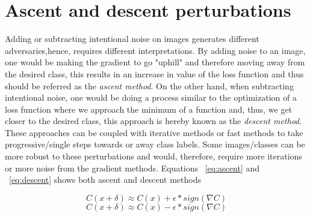 \section{Ascent and descent perturbations}\label{sec:gsm}

Adding or subtracting intentional noise on images generates different adversaries,hence, requires different interpretations. By adding noise to an image, one would be making the gradient to go "uphill" and therefore moving away from the desired class, this results in an increase in value of the loss function and thus should be referred as the \textit{ascent method}. On the other hand, when subtracting intentional noise, one would be doing a process similar to the optimization of a loss function where we approach the minimum of a function and, thus, we get closer to the desired class, this approach is hereby known as the \textit{descent method}. These approaches can be coupled with iterative methods or fast methods to take progressive/single steps towards or away class labels. Some images/classes can be more robust to these perturbations and would, therefore, require more iterations or more noise from the gradient methods. Equations ~\ref{eq:ascent} and ~\ref{eq:descent} shows both ascent and descent methods 

\begin{equation}\label{eq:ascent}
C(x + \delta)\approx C(x) + \epsilon * sign(\nabla C)
\end{equation}
\begin{equation}\label{eq:descent}
C(x + \delta)\approx C(x) - \epsilon * sign(\nabla C)
\end{equation}